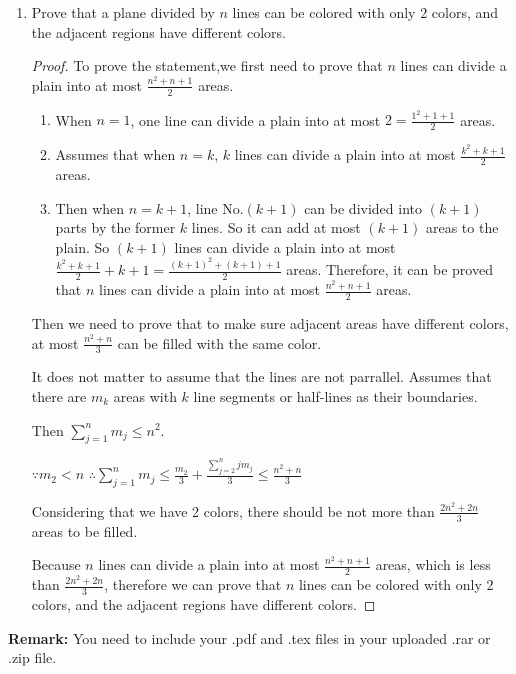 \documentclass[12pt,a4paper]{article}
\theoremstyle{definition}
\begin{document}
\begin{enumerate}
\begin{proof}
\begin{enumerate}
    	        $\therefore p_{n+1}<(1+\prod_{j=1}^n p_j)<2^{2^{n+1}}$
    	        
    	        From (a),(b) and (c), we can know that the former statement is true.
    	 
    	\end{enumerate}
        
    \end{proof}

    \item
    Prove that a plane divided by $n$ lines can be colored with only $2$ colors, and the adjacent regions have different colors.
    \begin{proof}
        To prove the statement,we first need to prove that $n$ lines can divide a plain into at most $\frac{n^2+n+1}{2}$ areas.
        
        \begin{enumerate}
        	
        	\item 
        	    When $n=1$, one line can divide a plain into at most $2=\frac{1^2+1+1}{2}$ areas.
        	\item
        	    Assumes that when $n=k$, $k$ lines can divide a plain into at most $\frac{k^2+k+1}{2}$ areas.
        	\item
        	    Then when $n=k+1$, line No.$(k+1)$ can be divided into $(k+1)$ parts by the former $k$ lines.
        	    So it can add at most $(k+1)$ areas to the plain.
        	    So $(k+1)$ lines can divide a plain into at most $\frac{k^2+k+1}{2}+k+1=\frac{(k+1)^2+(k+1)+1}{2}$ areas.
        	Therefore, it can be proved that $n$ lines can divide a plain into at most $\frac{n^2+n+1}{2}$ areas. 
        \end{enumerate}
    
        Then we need to prove that to make sure adjacent areas have different colors, at most $\frac{n^2+n}{3}$
        can be filled with the same color.
        
        It does not matter to assume that the lines are not parrallel. Assumes that there are $m_k$ areas with $k$ line segments or half-lines as their boundaries.
        
        Then $\sum_{j=1}^{n} m_j \le n^2 $.
        
        $\because m_2 < n$ $\therefore \sum_{j=1}^{n} m_j\le\frac{m_2}{3}+\frac{\sum_{j=2}^{n}jm_j}{3}\le\frac{n^2+n}{3}$
        	
        Considering that we have 2 colors, there should be not more than $\frac{2n^2+2n}{3}$ areas to be filled.
        
        Because $n$ lines can divide a plain into at most  $\frac{n^2+n+1}{2}$ areas, which is less than $\frac{2n^2+2n}{3}$, therefore we can prove that $n$ lines can be colored with only $2$ colors, and the adjacent regions have different colors.
        
    \end{proof}

\end{enumerate}

\vspace{20pt}

\textbf{Remark:} You need to include your .pdf and .tex files in your uploaded .rar or .zip file.

\end{document}
